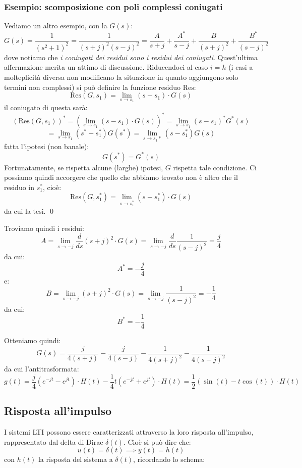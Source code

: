 \documentclass[a4paper,11pt]{article}
\begin{document}
\subsubsection{Esempio: scomposizione con poli complessi coniugati}
Vediamo un altro esempio, con la $G(s)$:
$$
G(s) = \frac{1}{(s^2 + 1)^2} = \frac{1}{(s + j)^2 (s - j)^2} = \frac{A}{s + j}+ \frac{A^*}{s - j} + \frac{B}{(s + j)^2} + \frac{B^*}{(s - j)^2}
$$
dove notiamo che \textit{i coniugati dei residui sono i residui dei coniugati}.
Quest'ultima affermazione merita un attimo di discussione.
Riducendoci al caso $i = h$ (i casi a molteplicità diversa non modificano la situazione in quanto aggiungono solo termini non complessi) si può definire la funzione residuo $\mathrm{Res}$:
$$
\mathrm{Res}(G, s_1) = \lim_{s \rightarrow s_1} (s - s_1) \cdot G(s)
$$
il coniugato di questa sarà:
$$
\left( \mathrm{Res}(G, s_1) \right)^* = \left( \lim_{s \rightarrow s_1} (s - s_1) \cdot G(s) \right)^* = \lim_{s \rightarrow s_1} (s - s_1)^* G^*(s)
$$
$$
= \lim_{s \rightarrow s_1} (s^* - s_1^*) G(s^*) = \lim_{s \rightarrow s_1*} (s - s_1^*) G(s) 
$$
fatta l'ipotesi (non banale):
$$
G(s^*) = G^*(s)
$$
Fortunatamente, se rispetta alcune (larghe) ipotesi, $G$ rispetta tale condizione.
Ci possiamo quindi accorgere che quello che abbiamo trovato non è altro che il residuo in $s_1^*$, cioè:
$$
\mathrm{Res}(G, s_1^*) = \lim_{s \rightarrow s_1^*} (s - s_1^*) \cdot G(s)
$$
da cui la tesi. \qed

\par\smallskip

Troviamo quindi i residui:
$$
A = \lim_{s \rightarrow -j} \frac{d}{ds} (s + j)^2 \cdot G(s) = \lim_{s \rightarrow -j} \frac{d}{ds} \frac{1}{(s - j)^2} = \frac{j}{4}
$$
da cui:
$$
A^* = -\frac{j}{4}
$$
e:
$$
B = \lim_{s \rightarrow -j}  (s + j)^2 \cdot G(s) = \lim_{s \rightarrow -j}  \frac{1}{(s - j)^2} = -\frac{1}{4}
$$
da cui:
$$
B^* = -\frac{1}{4}
$$

Otteniamo quindi:
$$
G(s) = \frac{j}{4(s + j)} - \frac{j}{4(s - j)} - \frac{1}{4(s + j)^2} - \frac{1}{4(s - j)^2}
$$
da cui l'antitrasformata:
$$
g(t) = \frac{j}{4} \left( e^{-jt} - e^{jt} \right) \cdot H(t) - \frac{1}{4}t \left( e^{-jt} + e^{jt} \right) \cdot H(t) = \frac{1}{2} \left( \sin(t) - t \cos(t) \right) \cdot H(t) 
$$

\subsection{Risposta all'impulso}
I sistemi LTI possono essere caratterizzati attraverso la loro risposta all'impulso, rappresentato dal delta di Dirac $\delta(t)$.
Cioè si può dire che:
$$
u(t) = \delta(t) \implies y(t) = h(t)
$$
con $h(t)$ la risposta del sistema a $\delta(t)$, ricordando lo schema:
\end{document}
